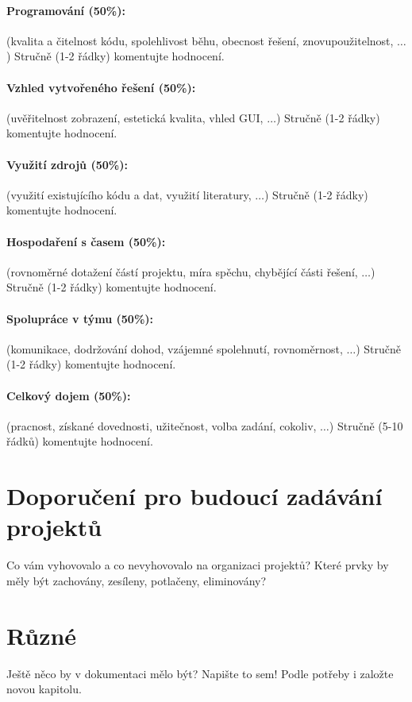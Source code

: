 \documentclass[11pt,a4paper]{article}
\begin{document}
\paragraph{Programování (50\%):} (kvalita a čitelnost kódu, spolehlivost běhu,
obecnost řešení, znovupoužitelnost, $\ldots$)
Stručně (1-2 řádky) komentujte hodnocení. 

\paragraph{Vzhled vytvořeného řešení (50\%):} (uvěřitelnost zobrazení,
estetická kvalita, vhled GUI, $\ldots$)
Stručně (1-2 řádky) komentujte hodnocení. 

\paragraph{Využití zdrojů (50\%):} (využití existujícího kódu a dat, využití
literatury, $\ldots$)
Stručně (1-2 řádky) komentujte hodnocení. 

\paragraph{Hospodaření s časem (50\%):} (rovnoměrné dotažení částí projektu,
míra spěchu, chybějící části řešení, $\ldots$)
Stručně (1-2 řádky) komentujte hodnocení. 

\paragraph{Spolupráce v týmu (50\%):} (komunikace, dodržování dohod, vzájemné
spolehnutí, rovnoměrnost, $\ldots$)
Stručně (1-2 řádky) komentujte hodnocení. 

\paragraph{Celkový dojem (50\%):} (pracnost, získané dovednosti, užitečnost,
volba zadání, cokoliv, $\ldots$)
Stručně (5-10 řádků) komentujte hodnocení. 

\section{Doporučení pro budoucí zadávání projektů}

Co vám vyhovovalo a co nevyhovovalo na organizaci projektů? Které prvky by měly
být zachovány, zesíleny, potlačeny, eliminovány?

\section{Různé}

Ještě něco by v dokumentaci mělo být? Napište to sem! Podle potřeby i založte
novou kapitolu.
\end{document}
